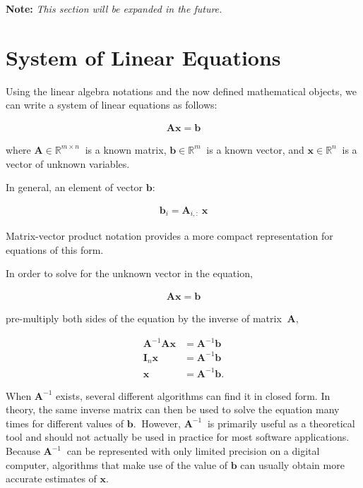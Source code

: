 \documentclass[12pt]{article}
\begin{document}
\textbf{Note:} \textit{This section will be expanded in the future.}

\section{System of Linear Equations}

Using the linear algebra notations and the now defined mathematical objects, we can write a system of linear equations as follows:

\begin{align}
\mathbf{A}\mathbf{x}=\mathbf{b}
\end{align}

where $\mathbf{A}\in\mathbb{R}^{m\times n}\ $ is a known matrix, $\mathbf{b}\in\mathbb{R}^{m}\ $ is a known vector, and $\mathbf{x}\in\mathbb{R}^{n}\ $ is a vector of unknown variables.

In general, an element of vector $\mathbf{b}:$

\begin{align}
\mathbf{b}_{i} = \mathbf{A}_{i,:}\ \mathbf{x}
\end{align}

Matrix-vector product notation provides a more compact representation for equations of this form.

In order to solve for the unknown vector in the equation,

\begin{align}
\mathbf{A}\mathbf{x}=\mathbf{b}
\end{align}

pre-multiply both sides of the equation by the inverse of matrix $\ \mathbf{A},$

\begin{align}
\mathbf{A}^{-1}\mathbf{A}\mathbf{x}& =\mathbf{A}^{-1}\mathbf{b}\\
\mathbf{I}_{n}\mathbf{x}& =\mathbf{A}^{-1}\mathbf{b}\\
\mathbf{x}& =\mathbf{A}^{-1}\mathbf{b}.
\end{align}

When $\mathbf{A}^{-1}$ exists, several different algorithms can find it in closed form. In theory, the same inverse matrix can then be used to solve the equation many times for different values of $\mathbf{b}.\ $ However, $\mathbf{A}^{-1}\ $ is primarily useful as a theoretical tool and should not actually be used in practice for most software applications. Because $\mathbf{A}^{-1}\ $ can be represented with only limited precision on a digital computer, algorithms that make use of the value of $\mathbf{b}$ can usually obtain more accurate estimates of $\mathbf{x}$.
\end{document}
